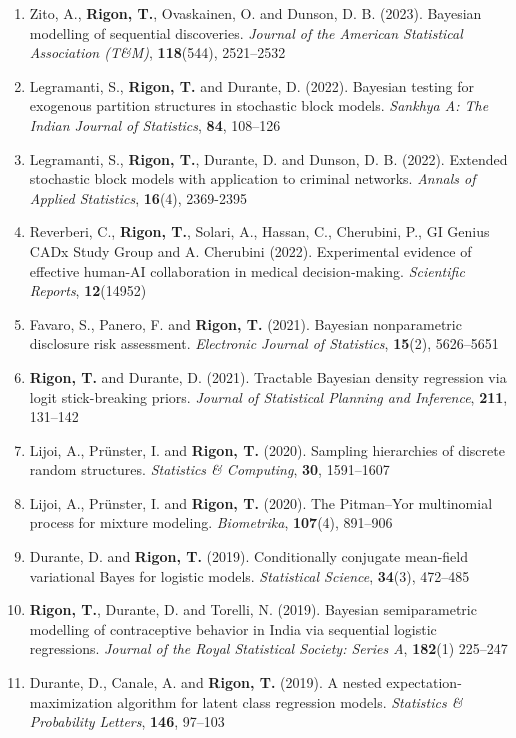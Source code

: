 \documentclass[10pt]{article}
\begin{document}
\begin{enumerate}
\item Zito, A., \textbf{Rigon, T.}, Ovaskainen, O. and Dunson, D. B. (2023). Bayesian modelling of sequential discoveries. \textit{Journal of the American Statistical Association (T\&M)}, \textbf{118}(544), 2521--2532

\item Legramanti, S., \textbf{Rigon, T.} and Durante, D. (2022). Bayesian testing for exogenous partition structures in stochastic block models. \textit{Sankhya A: The Indian Journal of Statistics}, \textbf{84}, 108--126

\item Legramanti, S., \textbf{Rigon, T.}, Durante, D. and Dunson, D. B. (2022). Extended stochastic block models with application to criminal networks. \textit{Annals of Applied Statistics}, \textbf{16}(4), 2369-2395

\item Reverberi, C., \textbf{Rigon, T.}, Solari, A., Hassan, C., Cherubini, P., GI Genius CADx Study Group and A. Cherubini (2022). Experimental evidence of effective human-AI collaboration in medical decision‐making. \textit{Scientific Reports}, \textbf{12}(14952)

\item Favaro, S., Panero, F. and \textbf{Rigon, T.} (2021). Bayesian nonparametric disclosure risk assessment. \textit{Electronic Journal of Statistics}, \textbf{15}(2), 5626--5651

\item \textbf{Rigon, T.} and Durante, D. (2021). Tractable Bayesian density regression via logit stick-breaking priors. \textit{Journal of Statistical Planning and Inference}, \textbf{211}, 131--142

\item Lijoi, A., Pr\"unster, I. and \textbf{Rigon, T.} (2020). Sampling hierarchies of discrete random structures. \textit{Statistics \& Computing}, \textbf{30}, 1591--1607

\item Lijoi, A., Pr\"unster, I. and \textbf{Rigon, T.} (2020). The Pitman--Yor multinomial process for mixture modeling. \textit{Biometrika}, \textbf{107}(4), 891--906

\item Durante, D. and \textbf{Rigon, T.} (2019). Conditionally conjugate mean-field variational Bayes for logistic models. \textit{Statistical Science}, \textbf{34}(3), 472--485

\item \textbf{Rigon, T.}, Durante, D. and Torelli, N. (2019). Bayesian semiparametric modelling of contraceptive behavior in India via sequential logistic regressions. \textit{Journal of the Royal Statistical Society: Series A}, \textbf{182}(1) 225--247

\item Durante, D., Canale, A. and \textbf{Rigon, T.} (2019). A nested expectation-maximization algorithm for latent class regression models. \textit{Statistics \& Probability Letters}, \textbf{146}, 97--103
\setcounter{publications}{\value{enumi}}
\end{enumerate}
\end{document}
